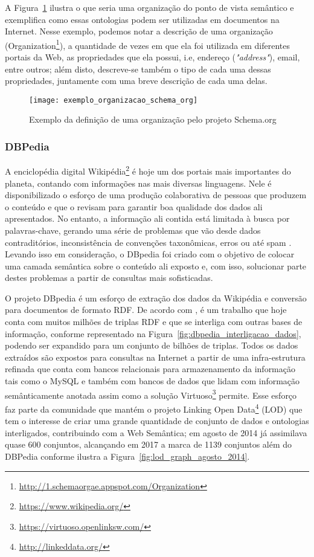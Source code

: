 A Figura~\ref{fig:exemplo_organizacao_schema_org} ilustra o que seria uma organização do ponto de vista semântico e exemplifica como essas ontologias podem ser utilizadas em documentos na Internet. Nesse exemplo, podemos notar a descrição de uma organização (Organization\footnote{\url{http://1.schemaorgae.appspot.com/Organization}}), a quantidade de vezes em que ela foi utilizada em diferentes portais da Web, as propriedades que ela possui, i.e, endereço (\emph{"address"}), email, entre outros; além disto, descreve-se também o tipo de cada uma dessas propriedades, juntamente com uma breve descrição de cada uma delas.

\begin{figure}[!ht]
  \centering
  \texttt{[image: exemplo\_organizacao\_schema\_org]} 
  \caption{Exemplo da definição de uma organização pelo projeto Schema.org}
  \label{fig:exemplo_organizacao_schema_org} 
\end{figure}

\subsubsection{DBPedia}
A enciclopédia digital  Wikipédia\footnote{\url{https://www.wikipedia.org/}} é hoje um dos portais mais importantes do planeta, contando com informações nas mais diversas linguagens. Nele é disponibilizado o esforço de uma produção colaborativa de pessoas que produzem o conteúdo e que o revisam para garantir boa qualidade dos dados ali apresentados. No entanto, a informação ali contida está limitada à busca por palavras-chave, gerando uma série de problemas que vão desde dados contraditórios, inconsistência de convenções taxonômicas, erros ou até spam \citep{Auer2007}. Levando isso em consideração, o DBpedia foi criado com o objetivo de colocar uma camada semântica sobre o conteúdo ali exposto e, com isso, solucionar parte destes problemas a partir de consultas mais sofisticadas.

O projeto DBpedia é um esforço de extração dos dados da Wikipédia e conversão para documentos de formato RDF. De acordo com \citet{Auer2007}, é um trabalho que hoje conta com muitos milhões de triplas RDF e que se interliga com outras bases de informação, conforme representado na Figura~\ref{fig:dbpedia_interligacao_dados}, podendo ser expandido para um conjunto de bilhões de triplas. Todos os dados extraídos são expostos para consultas na Internet a partir de uma infra-estrutura refinada que conta com bancos  relacionais para armazenamento da informação tais como o MySQL e também com bancos de dados que lidam com informação semânticamente anotada assim como a solução Virtuoso\footnote{\url{https://virtuoso.openlinksw.com/}} permite. Esse esforço faz parte da comunidade que mantém o projeto Linking Open Data\footnote{\url{http://linkeddata.org/}} (LOD) que tem o interesse de criar uma grande quantidade de conjunto de dados e ontologias interligados, contribuindo com a Web Semântica; em agosto de 2014 já assimilava quase 600 conjuntos, alcançando em 2017 a marca de 1139 conjuntos além do DBPedia conforme ilustra a Figura~\ref{fig:lod_graph_agosto_2014}. 

